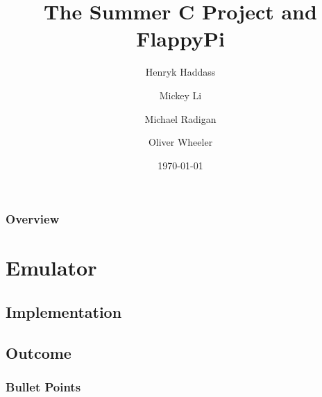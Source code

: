 \documentclass{beamer}
\title[FlappyPi]{The Summer C Project and FlappyPi} %
\author[Group 16]{Henryk Haddass \and Mickey Li \and Michael Radigan \and Oliver Wheeler}%
\institute[Imperial DoC] %
{
Group 16
\medskip
}
\date{\today} %
\begin{document}
\begin{frame}
\titlepage %
\end{frame}

\begin{frame}
\frametitle{Overview} %
\tableofcontents %
\end{frame}


\section{Emulator} %


\subsection{Implementation} %

\begin{frame}
\frametitle{}






\end{frame}

\subsection{Outcome}
\begin{frame}
\frametitle{Bullet Points}




\end{frame}
\end{document}
